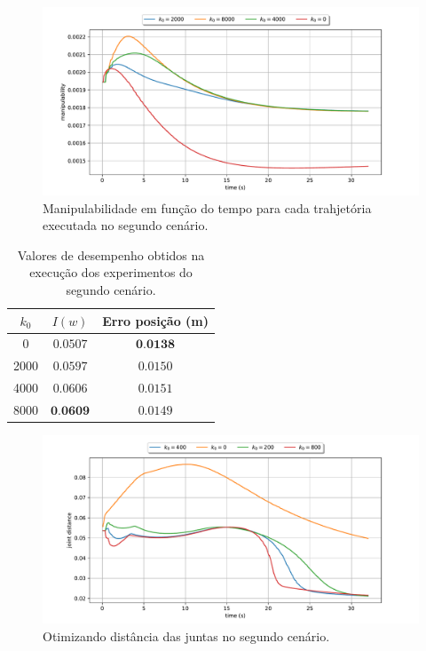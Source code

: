 \begin{figure}
	\centering
	\includegraphics[width=\textwidth]{./Images/2024-06-11-09-17-48/metric_manipulability.pdf}
	\caption{Manipulabilidade em função do tempo para cada trahjetória executada no segundo cenário.}\label{fig:exp2-metric}
\end{figure}

\begin{table}[htbp]
    \centering
    \begin{tabular}{ccc}
        \toprule
        \( k_0 \) & \( I(w) \)  & Erro posição (m) \\
        \midrule
        0  & \( 0.0507 \) & \( \textbf{0.0138} \) \\
        2000  & \( 0.0597 \) & \( 0.0150 \) \\
        4000  & \( 0.0606 \) & \( 0.0151 \) \\
        8000  & \( \textbf{0.0609} \) & \( 0.0149 \) \\
        \bottomrule
    \end{tabular}
    \caption{Valores de desempenho obtidos na execução dos experimentos do segundo cenário.}
    \label{tab:scores-exp2}
\end{table}

\begin{figure}
	\centering
	\includegraphics[width=\textwidth]{./Images/2024-07-02-14-04-38/metric_joint_distance.pdf}
	\caption{Otimizando distância das juntas no segundo cenário.}\label{fig:exp3-metric}
\end{figure}

